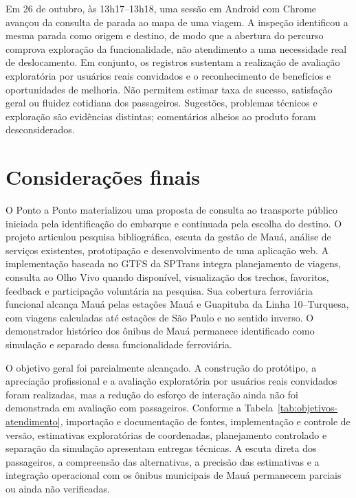 \documentclass[12pt,oneside,a4paper,brazil,chapter=TITLE]{abntex2}
\begin{document}
Em 26 de outubro, às 13h17--13h18, uma sessão em Android com Chrome avançou da consulta de parada ao mapa de uma viagem. A inspeção identificou a mesma parada como origem e destino, de modo que a abertura do percurso comprova exploração da funcionalidade, não atendimento a uma necessidade real de deslocamento. Em conjunto, os registros sustentam a realização de avaliação exploratória por usuários reais convidados e o reconhecimento de benefícios e oportunidades de melhoria. Não permitem estimar taxa de sucesso, satisfação geral ou fluidez cotidiana dos passageiros. Sugestões, problemas técnicos e exploração são evidências distintas; comentários alheios ao produto foram desconsiderados.



\chapter{Considerações finais}
O Ponto a Ponto materializou uma proposta de consulta ao transporte público iniciada pela identificação do embarque e continuada pela escolha do destino. O projeto articulou pesquisa bibliográfica, escuta da gestão de Mauá, análise de serviços existentes, prototipação e desenvolvimento de uma aplicação web. A implementação baseada no GTFS da SPTrans integra planejamento de viagens, consulta ao Olho Vivo quando disponível, visualização dos trechos, favoritos, feedback e participação voluntária na pesquisa. Sua cobertura ferroviária funcional alcança Mauá pelas estações Mauá e Guapituba da Linha 10--Turquesa, com viagens calculadas até estações de São Paulo e no sentido inverso. O demonstrador histórico dos ônibus de Mauá permanece identificado como simulação e separado dessa funcionalidade ferroviária.

O objetivo geral foi parcialmente alcançado. A construção do protótipo, a apreciação profissional e a avaliação exploratória por usuários reais convidados foram realizadas, mas a redução do esforço de interação ainda não foi demonstrada em avaliação com passageiros. Conforme a Tabela~\ref{tab:objetivos-atendimento}, importação e documentação de fontes, implementação e controle de versão, estimativas exploratórias de coordenadas, planejamento controlado e separação da simulação apresentam entregas técnicas. A escuta direta dos passageiros, a compreensão das alternativas, a precisão das estimativas e a integração operacional com os ônibus municipais de Mauá permanecem parciais ou ainda não verificadas.
\end{document}
